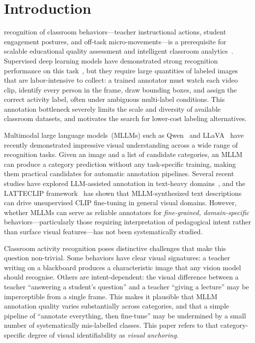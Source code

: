 \documentclass{ieeeaccess}
\begin{document}
\titlepgskip=-15pt

\maketitle

\section{Introduction}
\label{sec:intro}

 recognition of classroom behaviors---teacher instructional
actions, student engagement postures, and off-task micro-movements---is
a prerequisite for scalable educational quality assessment and
intelligent classroom analytics~\cite{brophy2000teaching,anderson2004classroom}.
Supervised deep learning models have demonstrated strong recognition
performance on this task~\cite{li2022classroom_transformer,zhang2020classroom_cnn},
but they require large quantities of labeled images that are
labor-intensive to collect: a trained annotator must watch each video
clip, identify every person in the frame, draw bounding boxes, and
assign the correct activity label, often under ambiguous multi-label
conditions.
This annotation bottleneck severely limits the scale and diversity of
available classroom datasets, and motivates the search for
lower-cost labeling alternatives.

Multimodal large language models~(MLLMs) such as
Qwen~\cite{bai2023qwen} and LLaVA~\cite{liu2023llava}
have recently demonstrated impressive visual understanding across a
wide range of recognition tasks.
Given an image and a list of candidate categories, an MLLM can produce
a category prediction without any task-specific training, making them
practical candidates for automatic annotation pipelines.
Several recent studies have explored LLM-assisted annotation in
text-heavy domains~\cite{gilardi2023chatgpt,he2023annollm}, and
the LATTECLIP framework~\cite{cao2025latteclip} has shown that
MLLM-synthesized text descriptions can drive unsupervised CLIP
fine-tuning in general visual domains.
However, whether MLLMs can serve as reliable annotators for
\emph{fine-grained, domain-specific} behaviors---particularly those
requiring interpretation of pedagogical intent rather than surface
visual features---has not been systematically studied.

Classroom activity recognition poses distinctive challenges that
make this question non-trivial.
Some behaviors have clear visual signatures: a teacher writing on a
blackboard produces a characteristic image that any vision model should
recognise.
Others are intent-dependent: the visual difference between a teacher
``answering a student's question'' and a teacher ``giving a lecture''
may be imperceptible from a single frame.
This makes it plausible that MLLM annotation quality varies
substantially across categories, and that a simple pipeline of
``annotate everything, then fine-tune'' may be undermined by a small
number of systematically mis-labelled classes.
This paper refers to that category-specific degree of visual
identifiability as \emph{visual anchoring}.
\end{document}
